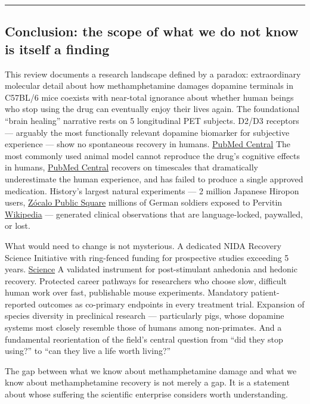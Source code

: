 \begin{center}\rule{0.5\linewidth}{0.5pt}\end{center}

\subsection{Conclusion: the scope of what we do not know is itself a finding}\label{14_what_we_dont_know-conclusion-the-scope-of-what-we-do-not-know-is-itself-a-finding}

This review documents a research landscape defined by a paradox: extraordinary molecular detail about how methamphetamine damages dopamine terminals in C57BL/6 mice coexists with near-total ignorance about whether human beings who stop using the drug can eventually enjoy their lives again. The foundational ``brain healing'' narrative rests on 5 longitudinal PET subjects. D2/D3 receptors --- arguably the most functionally relevant dopamine biomarker for subjective experience --- show no spontaneous recovery in humans. \href{https://pmc.ncbi.nlm.nih.gov/articles/PMC4832026/}{PubMed Central} The most commonly used animal model cannot reproduce the drug's cognitive effects in humans, \href{https://pmc.ncbi.nlm.nih.gov/articles/PMC2854319/}{PubMed Central} recovers on timescales that dramatically underestimate the human experience, and has failed to produce a single approved medication. History's largest natural experiments --- 2 million Japanese Hiropon users, \href{https://www.zocalopublicsquare.org/the-world-war-ii-wonder-drug-that-never-left-japan/}{Zócalo Public Square} millions of German soldiers exposed to Pervitin \href{https://en.wikipedia.org/wiki/Drug_policy_of_Nazi_Germany}{Wikipedia} --- generated clinical observations that are language-locked, paywalled, or lost.

What would need to change is not mysterious. A dedicated NIDA Recovery Science Initiative with ring-fenced funding for prospective studies exceeding 5 years. \href{https://www.science.org/doi/10.1126/sciadv.aaz6596}{Science} A validated instrument for post-stimulant anhedonia and hedonic recovery. Protected career pathways for researchers who choose slow, difficult human work over fast, publishable mouse experiments. Mandatory patient-reported outcomes as co-primary endpoints in every treatment trial. Expansion of species diversity in preclinical research --- particularly pigs, whose dopamine systems most closely resemble those of humans among non-primates. And a fundamental reorientation of the field's central question from ``did they stop using?'' to ``can they live a life worth living?''

The gap between what we know about methamphetamine damage and what we know about methamphetamine recovery is not merely a gap. It is a statement about whose suffering the scientific enterprise considers worth understanding.
